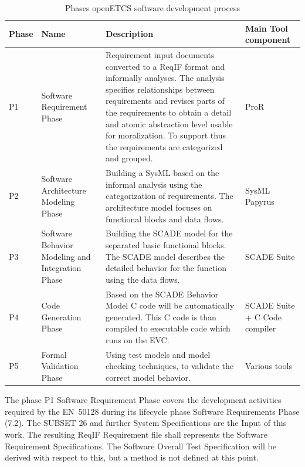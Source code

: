 \documentclass{template/openetcs_report}
\begin{document}
\begin{table}[htbp]
  \centering
  
  \caption{Phases openETCS software development process}
\begin{tabular}{|p{1cm}|p{2cm}|p{7.5cm}|p{2.5cm}|}
\hline \textbf{Phase} & \textbf{Name} & \textbf{Description} & \textbf{Main Tool component} \\ 
\hline P1 & Software Requirement Phase & Requirement input documents converted to a ReqIF format and informally analyses. The analysis specifies relationships between requirements and revises parts of the requirements to obtain a detail and atomic abstraction level usable for moralization. To support thus the requirements are categorized and grouped. & ProR \\ 
\hline P2 & Software Architecture Modeling Phase & Building a SysML based on the informal analysis using the categorization of requirements. The architecture model focuses on functional blocks and data flows. & SysML Papyrus \\ 
\hline P3 & Software Behavior Modeling and Integration Phase & Building the SCADE model for the separated basic functional blocks. The SCADE model describes the detailed behavior for the function using the data flows. & SCADE Suite \\ 
\hline P4 & Code Generation Phase & Based on the SCADE Behavior Model C code will be automatically generated. This C code is than compiled to executable code which runs on the EVC. & SCADE Suite + C Code compiler\\
\hline P5 & Formal Validation Phase & Using test models and model checking techniques, to validate the correct model behavior.  & Various tools \\ 
\hline 
\end{tabular} 
\label{tab:DevelopmentPhases}
\end{table}

The phase P1 Software Requirement Phase covers the development activities required by the EN~50128 during its lifecycle phase Software Requirements Phase (7.2). The SUBSET 26 and further System Specifications are the Input of this work. The resulting ReqIF Requirement file shall represents the Software Requirement Specifications. The Software Overall Test Specification will be derived with respect to this, but a method is not defined at this point.
\end{document}
